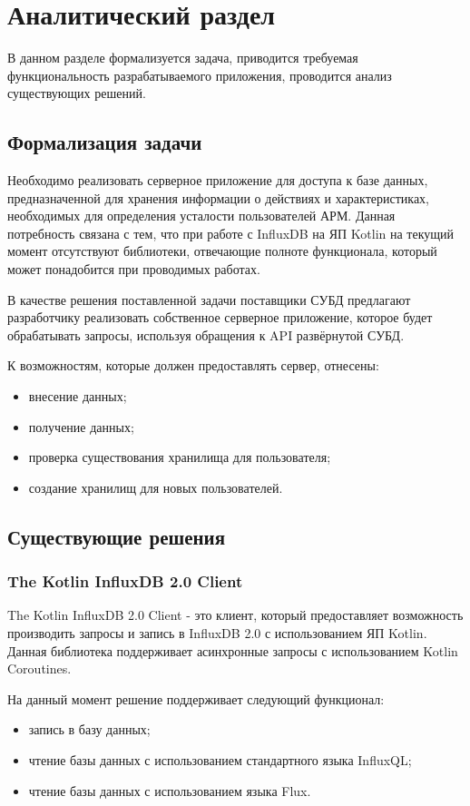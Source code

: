 \section{Аналитический раздел}

В данном разделе формализуется задача, приводится требуемая функциональность разрабатываемого приложения, проводится анализ существующих решений.

\subsection{Формализация задачи}
Необходимо реализовать серверное приложение для доступа к базе данных, предназначенной для хранения информации о действиях и характеристиках, необходимых для определения усталости пользователей АРМ. Данная потребность связана с тем, что при работе с InfluxDB на ЯП Kotlin на текущий момент отсутствуют библиотеки, отвечающие полноте функционала, который может понадобится при проводимых работах.

В качестве решения поставленной задачи поставщики СУБД предлагают разработчику реализовать собственное серверное приложение, которое будет обрабатывать запросы, используя обращения к API развёрнутой СУБД.

К возможностям, которые должен предоставлять сервер, отнесены:
\begin{itemize}[leftmargin=1.6\parindent]
\item внесение данных;
\item получение данных;
\item проверка существования хранилища для пользователя;
\item создание хранилищ для новых пользователей.
\end{itemize}

\subsection{Существующие решения}
\subsubsection{The Kotlin InfluxDB 2.0 Client}
The Kotlin InfluxDB 2.0 Client \cite{influxClient} - это клиент, который предоставляет возможность производить запросы и запись в InfluxDB 2.0 с использованием ЯП Kotlin. Данная библиотека поддерживает асинхронные запросы с использованием Kotlin Coroutines.

На данный момент решение поддерживает следующий функционал:
\begin{itemize}[leftmargin=1.6\parindent]
\item запись в базу данных;
\item чтение базы данных с использованием стандартного языка InfluxQL;
\item чтение базы данных с использованием языка Flux.
\end{itemize}

